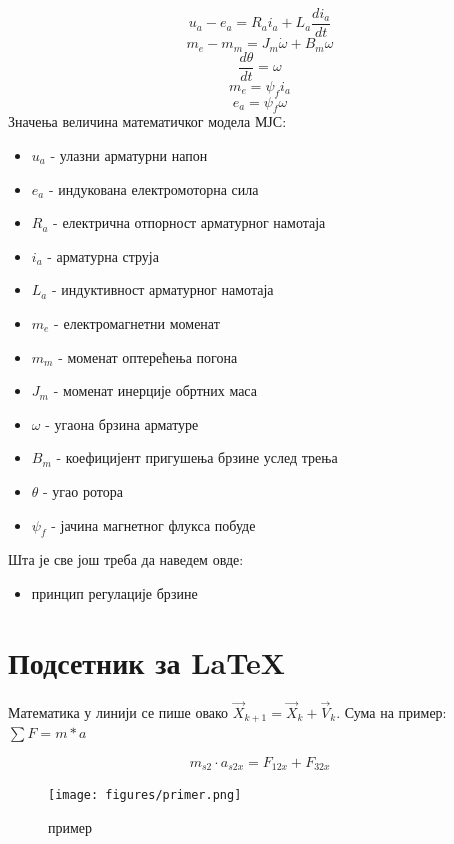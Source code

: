 \documentclass[12pt]{article}
\begin{document}
\begin{equation}
    u_a-e_a=R_ai_a+L_a\dfrac{di_a}{dt}
\end{equation}
\begin{equation}
    m_e-m_m=J_m \dot\omega+B_m\omega
\end{equation}
\begin{equation}
    \dfrac{d\theta}{dt}=\omega
\end{equation}
\begin{equation}
    m_e=\psi _fi_a
\end{equation}
\begin{equation}
    e_a=\psi _f\omega
\end{equation}
Значења величина математичког модела МЈС:
\begin{itemize}
    \item $u_a$ - улазни арматурни напон
    \item $e_a$ - индукована електромоторна сила
    \item $R_a$ - електрична отпорност арматурног намотаја
    \item $i_a$ - арматурна струја
    \item $L_a$ - индуктивност арматурног намотаја
    \item $m_e$ - електромагнетни моменат
    \item $m_m$ - моменат оптерећења погона
    \item $J_m$ - моменат инерције обртних маса
    \item $\omega$ - угаона брзина арматуре
    \item $B_m$ - коефицијент пригушења брзине услед трења
    \item $\theta$ - угао ротора
    \item $\psi _f$ - јачина магнетног флукса побуде
\end{itemize}

Шта је све још треба да наведем овде:
\begin{itemize}
    \item принцип регулације брзине
\end{itemize}

\section{Подсетник за \LaTeX}
Математика у линији се пише овако $\vec X_{k+1}=\vec X_k+\vec V_k$.
Сума на пример: $\sum F=m*a$

\begin{equation}
    m_{s2} \cdot a_{s2x}=F_{12x}+F_{32x}
\end{equation}

\begin{figure}[H]
    \centering
    \texttt{[image: figures/primer.png]}
    \caption{пример}
    \label{fig:enter-label}
\end{figure}
\end{document}

